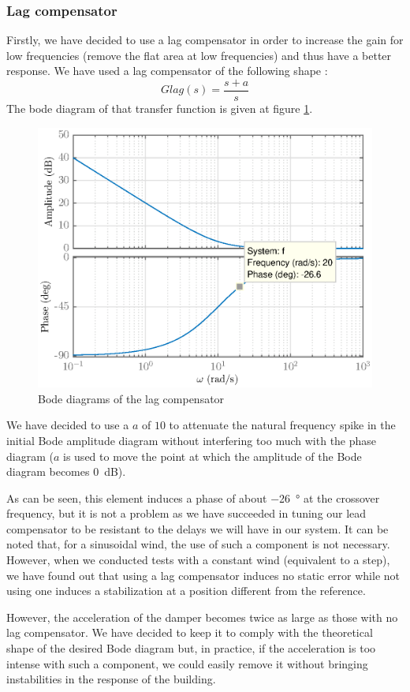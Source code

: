 \subsubsection{Lag compensator}
Firstly, we have decided to use a lag compensator in order to increase the gain for low frequencies (remove the flat area at low frequencies) and thus have a better response. We have used a lag compensator of the following shape :
$$
Glag(s) = \dfrac{s + a}{s}
$$
The bode diagram of that transfer function is given at figure \ref{fig:glag}.
\begin{figure}[H]
    \centering
    \includegraphics[scale = 0.8]{resources/eps/4-Val/glag.eps}
    \caption{Bode diagrams of the lag compensator}
    \label{fig:glag}
\end{figure}
We have decided to use a $a$ of $10$ to attenuate the natural frequency spike in the initial Bode amplitude diagram without interfering too much with the phase diagram ($a$ is used to move the point at which the amplitude of the Bode diagram becomes \SI{0}{\deci\bel}).\par
As can be seen, this element induces a phase of about \SI{-26}{\degree} at the crossover frequency, but it is not a problem as we have succeeded in tuning our lead compensator to be resistant to the delays we will have in our system. It can be noted that, for a sinusoidal wind, the use of such a component is not necessary. However, when we conducted tests with a constant wind (equivalent to a step), we have found out that using a lag compensator induces no static error while not using one induces a stabilization at a position different from the reference.\par
However, the acceleration of the damper becomes twice as large as those with no lag compensator. We have decided to keep it to comply with the theoretical shape of the desired Bode diagram but, in practice, if the acceleration is too intense with such a component, we could easily remove it without bringing instabilities in the response of the building.

